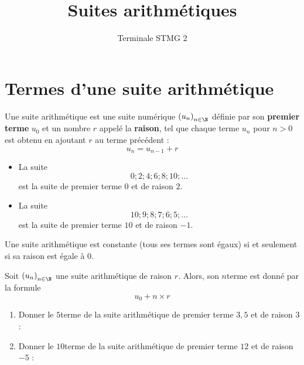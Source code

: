 \documentclass{article}
\title{Suites arithmétiques}
\date{}
\author{Terminale STMG 2}
\begin{document}
\maketitle
\section{Termes d'une suite arithmétique}
\begin{tcolorbox}
\begin{definition}[Rappel]
Une suite arithmétique est une suite numérique $\left(u_n\right)_{n \in \N}$ définie par son \textbf{premier terme} $u_0$ et un nombre $r$ appelé la \textbf{raison}, tel que chaque terme $u_n$ pour $n > 0$ est obtenu en ajoutant $r$ au terme précédent :
\begin{equation*}
u_n = u_{n-1} + r
\end{equation*} 
\end{definition}
\end{tcolorbox}
\begin{example}
\begin{itemize}
\item La suite
\begin{equation*}
0; 2; 4; 6; 8; 10; \dots
\end{equation*}
est la suite de premier terme $0$ et de raison $2$.
\item La suite 
\begin{equation*}
10; 9; 8; 7; 6; 5; \dots    
\end{equation*}
est la suite de premier terme $10$ et de raison $-1$.
\end{itemize}
\end{example}
\begin{remark}
Une suite arithmétique est constante (tous ses termes sont égaux) si et seulement si sa raison est égale à $0$.
\end{remark}
\begin{proposition}
Soit $\left(u_n\right)_{n \in \N}$ une suite arithmétique de raison $r$. Alors, son $n$\ieme terme est donné par la formule
\begin{equation*}
u_0 + n \times r
\end{equation*}
\end{proposition}
\begin{example}
\hfill
\begin{enumerate}[label=\emph{\alph*)}]
\item Donner le $5$\ieme terme de la suite arithmétique de premier terme $3,5$ et de raison $3$ : \answersline
\item Donner le $10$\ieme terme de la suite arithmétique de premier terme $12$ et de raison $-5$ : \answersline 
\end{enumerate}
\end{example}
\end{document}
